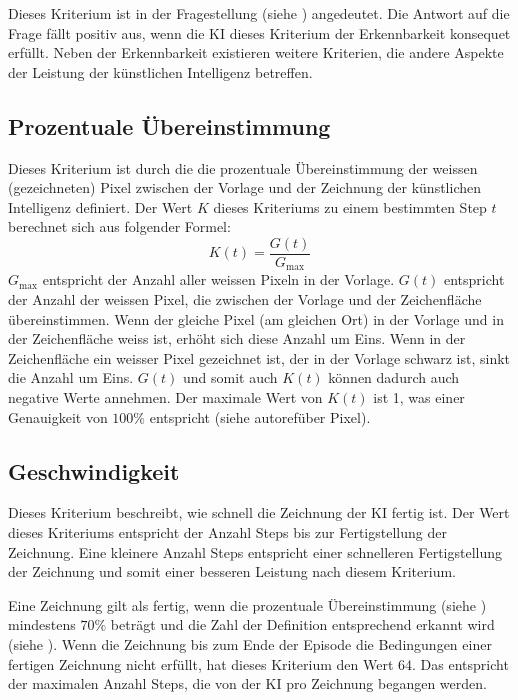 Dieses Kriterium ist in der Fragestellung (siehe )
angedeutet. Die Antwort auf die Frage fällt positiv aus, wenn die KI dieses
Kriterium der Erkennbarkeit konsequet erfüllt. Neben der Erkennbarkeit
existieren weitere Kriterien, die andere Aspekte der Leistung der künstlichen
Intelligenz betreffen.

\subsection{Prozentuale Übereinstimmung}
\label{sub:m_eval_proc}
Dieses Kriterium ist durch die die prozentuale Übereinstimmung der weissen
(gezeichneten) Pixel zwischen der Vorlage und der Zeichnung der künstlichen
Intelligenz definiert. Der Wert $K$ dieses Kriteriums zu einem bestimmten Step
$t$ berechnet sich aus folgender Formel:
\[ K(t) = \frac{G(t)}{G_{\max}} \]
$G_{\max}$ entspricht der Anzahl aller weissen Pixeln in der Vorlage. $G(t)$
entspricht der Anzahl der weissen Pixel, die zwischen der Vorlage und der
Zeichenfläche übereinstimmen. Wenn der gleiche Pixel (am gleichen Ort) in der
Vorlage und in der Zeichenfläche weiss ist, erhöht sich diese Anzahl um Eins.
Wenn in der Zeichenfläche ein weisser Pixel gezeichnet ist, der in der Vorlage
schwarz ist, sinkt die Anzahl um Eins. $G(t)$ und somit auch $K(t)$ können
dadurch auch negative Werte annehmen. Der maximale Wert von $K(t)$ ist 1, was
einer Genauigkeit von $100\%$ entspricht (siehe autoref{über Pixel}).


\subsection{Geschwindigkeit}\label{sub:m_eval_speed}
Dieses Kriterium beschreibt, wie schnell die Zeichnung der KI fertig ist. Der
Wert dieses Kriteriums entspricht der Anzahl Steps bis zur Fertigstellung der
Zeichnung. Eine kleinere Anzahl Steps entspricht einer schnelleren Fertigstellung
der Zeichnung und somit einer besseren Leistung nach diesem Kriterium.

Eine Zeichnung gilt als fertig, wenn die prozentuale Übereinstimmung (siehe
) mindestens $70\%$ beträgt und die Zahl der Definition
entsprechend erkannt wird (siehe ). Wenn die Zeichnung
bis zum Ende der Episode die Bedingungen einer fertigen Zeichnung nicht erfüllt,
hat dieses Kriterium den Wert $64$. Das entspricht der maximalen Anzahl Steps,
die von der KI pro Zeichnung begangen werden.


